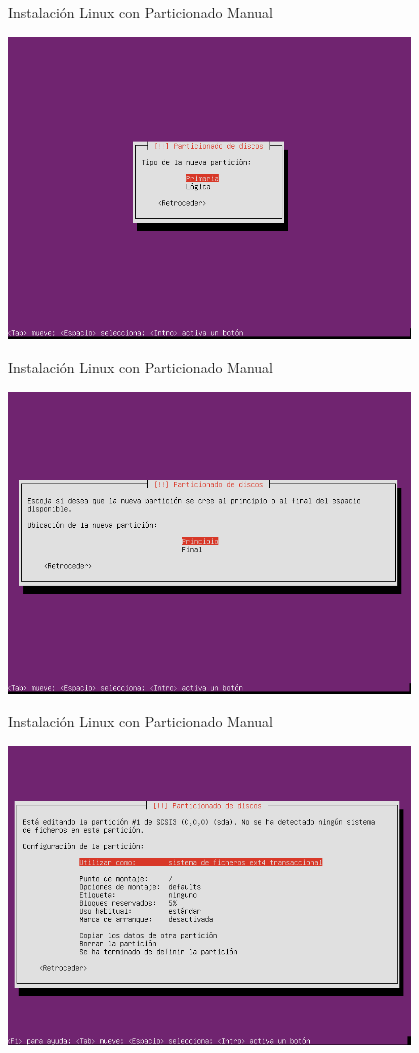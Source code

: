 \begin{frame}{Instalación Linux con Particionado Manual}
 \begin{center}
  \includegraphics[width=0.8\textwidth]{images/install8.png}
 \end{center}
\end{frame}

\begin{frame}{Instalación Linux con Particionado Manual}
 \begin{center}
  \includegraphics[width=0.8\textwidth]{images/install9.png}
 \end{center}
\end{frame}

\begin{frame}{Instalación Linux con Particionado Manual}
 \begin{center}
  \includegraphics[width=0.8\textwidth]{images/install10.png}
 \end{center}
\end{frame}

